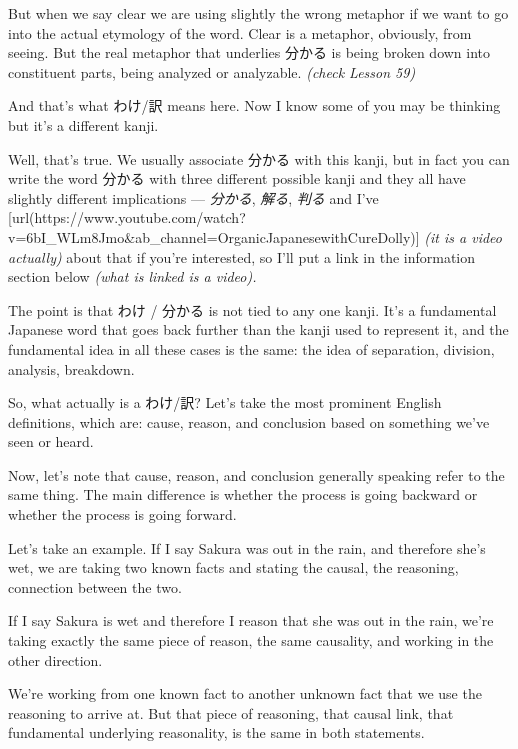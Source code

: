But when we say clear we are using slightly the wrong metaphor if we want to go into the actual etymology of the word. Clear is a metaphor, obviously, from seeing. But the real metaphor that underlies 分かる is being broken down into constituent parts, being analyzed or analyzable. {\em (check Lesson 59)}

{}

And that's what わけ/訳 means here. Now I know some of you may be thinking but it's a different kanji.

{}

Well, that's true. We usually associate 分かる with this kanji, but in fact you can write the word 分かる with three different possible kanji and they all have slightly different implications --- {\em 分かる}, {\em 解る}, {\em 判る} and I've [url(https://www.youtube.com/watch?v=6bI_WLm8Jmo&ab_channel=OrganicJapanesewithCureDolly)] {\em (it is a video actually)} about that if you're interested, so I'll put a link in the information section below {\em (what is linked is a video).}

The point is that わけ / 分かる is not tied to any one kanji. It's a fundamental Japanese word that goes back further than the kanji used to represent it, and the fundamental idea in all these cases is the same: the idea of separation, division, analysis, breakdown.

So, what actually is a わけ/訳? Let's take the most prominent English definitions, which are: cause, reason, and conclusion based on something we've seen or heard.

Now, let's note that cause, reason, and conclusion generally speaking refer to the same thing. The main difference is whether the process is going backward or whether the process is going forward.

Let's take an example. If I say Sakura was out in the rain, and therefore she's wet, we are taking two known facts and stating the causal, the reasoning, connection between the two.

{}

If I say Sakura is wet and therefore I reason that she was out in the rain, we're taking exactly the same piece of reason, the same causality, and working in the other direction.

{}

We're working from one known fact to another unknown fact that we use the reasoning to arrive at. But that piece of reasoning, that causal link, that fundamental underlying reasonality, is the same in both statements.

